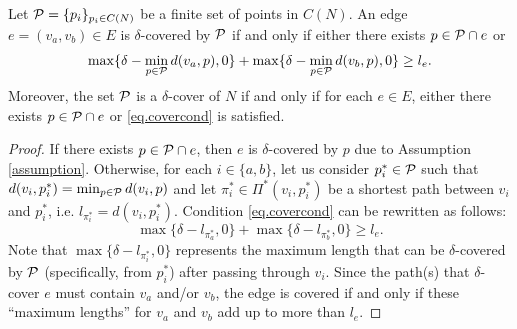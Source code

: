  \begin{proposition}
 \label{thm.cover}
Let $\mathcal P=\{p_i\}_{p_i\in C(N)}$ be a finite set  of points in $C(N)$. An edge $e=(v_a, v_b) \in E$ is $\delta$-covered by $\mathcal P$ if and only if either there exists $p \in \mathcal P\cap e$ or
 \begin{equation}
	\label{eq.covercond}
    	\max\{\delta -  \min_{p \in \mathcal P} d(v_a,p),0\} +  \max \{\delta - \min_{p \in \mathcal P} d(v_b,p), 0 \} \ge l_e.
	\end{equation}
Moreover, the set $\mathcal P$ is a $\delta$-cover of $N$ if and only if for each $e\in E$, either there exists $p \in \mathcal P\cap e$ or \eqref{eq.covercond} is satisfied.
\end{proposition}
\begin{proof}  
If there exists $p\in \mathcal P\cap e$, then $e$ is $\delta$-covered by $p$ due to Assumption \ref{assumption}.
Otherwise, for each $i\in\{a,b\}$, let us consider $p^*_i \in \mathcal P$ such that $d(v_i,p^*_i)=\min_{p \in \mathcal P} d(v_i,p)$ and let  $\pi^*_i\in \Pi^*(v_i,p_i^*)$ be a shortest path between $v_i$ and $p_i^*$, i.e. $l_{\pi^*_i}= d(v_i,p^*_i)$. Condition \eqref{eq.covercond} can be rewritten as follows:
$$ \max\{\delta - l_{\pi^*_a},0\} +  \max \{\delta - l_{\pi^*_b}, 0 \} \ge l_e.$$
Note that $\max\{\delta - l_{\pi^*_i},0\} $ represents the maximum length that can be $\delta$-covered by $\mathcal P$ (specifically, from $p^*_i$) after passing through $v_i$. Since the path(s) that $\delta$-cover $e$ must contain $v_a$ and/or $v_b$, the edge is covered if and only if these ``maximum lengths'' for $v_a$ and $v_b$ add up to more than $l_e$.


\end{proof}
